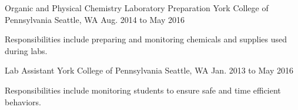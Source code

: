 \begin{cventries}


  \cventry
    {Organic and Physical Chemistry Laboratory Preparation} %
    {York College of Pennsylvania} %
    {Seattle, WA} %
    {Aug. 2014 to May 2016} %
    {
      \begin{cvitems} %
        \item {Responsibilities include preparing and monitoring chemicals and supplies used during labs.}
      \end{cvitems}
    }

  \cventry
    {Lab Assistant} %
    {York College of Pennsylvania} %
    {Seattle, WA} %
    {Jan. 2013 to May 2016} %
    {
      \begin{cvitems} %
        \item {Responsibilities include monitoring students to ensure safe and time efficient behaviors.}
      \end{cvitems}
    }


\end{cventries}
